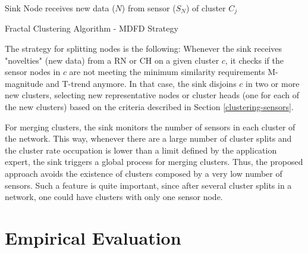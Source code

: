 \documentclass[conference]{IEEEtran}
\begin{document}
\begin{algorithm}
 \SetAlgoLined
 \LinesNumbered
 Sink Node receives new data ($N$) from sensor ($S_N$) of cluster $C_j$\;
 \caption{Fractal Clustering Algorithm - MDFD Strategy}
 \label{alg:MDFD}
\end{algorithm}


The strategy for splitting nodes is the following: Whenever the sink receives
"novelties" (new data) from a RN or CH on a given cluster $c$, it checks if the sensor nodes
in $c$ are not meeting the minimum similarity requirements M-magnitude and
T-trend anymore. In that case, the sink disjoins $c$ in two or more new
clusters, selecting new representative nodes or cluster heads (one for each of
the new clusters) based on the criteria described in Section
\ref{clustering-sensors}.

For merging clusters, the sink monitors the number of sensors in each cluster of
the network. This way, whenever there are a large number of cluster splits and
the cluster rate occupation is lower than a limit defined by the application
expert, the sink triggers a global process for merging clusters. Thus, the
proposed approach avoids the existence of clusters composed by a very low number
of sensors. Such a feature is quite important, since after several cluster
splits in a network, one could have clusters with only one sensor node.

\section{Empirical Evaluation}
\label{eval}
\end{document}
